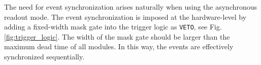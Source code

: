 \documentclass[number,5p]{elsarticle}
\begin{document}
The need for event synchronization arises naturally when using the asynchronous
readout mode.
The event synchronization is imposed at the hardware-level by adding a fixed-width mask gate into the trigger logic as \texttt{VETO}, see Fig. \ref{fig:trigger_logic}.
The width of the mask gate should be larger than the maximum dead time of all modules.
In this way, the events are effectively synchronized sequentially. 
\end{document}
